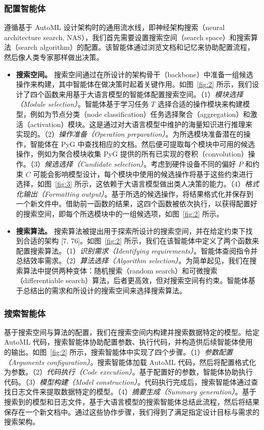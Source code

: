 \documentclass[11pt,UTF8,fontset=fandol]{ctexart}
\begin{document}
\subsubsection{配置智能体}
遵循基于 AutoML 设计架构时的通用流水线，即神经架构搜索（neural architecture search, NAS），我们首先需要设置搜索空间（search space）和搜索算法（search algorithm）的配置。该智能体通过浏览文档和记忆来协助配置流程，然后像人类专家那样做出决策。
\begin{itemize}[leftmargin=1.4em]
\item \textbf{搜索空间。} 搜索空间通过在所设计的架构骨干（backbone）中准备一组候选操作来构建，其中智能体在做决策时起着关键作用。如图~\ref{fig:2} 所示，我们设计了四个函数来用基于大语言模型的智能体配置搜索空间。（1）\textit{模块选择（Module selection）}。智能体基于学习任务 $T$ 选择合适的操作模块来构建模型，例如为节点分类（node classification）任务选择聚合（aggregation）和激活（activation）模块。这是通过对大语言模型中维护的海量知识进行推理来实现的。（2）\textit{操作准备（Operation preparation）}。为所选模块准备潜在的操作，智能体在 PyG 中查找相应的文档。然后便可提取每个模块中可用的候选操作，例如为聚合模块收集 PyG 提供的所有已实现的卷积（convolution）操作。（3）\textit{候选选择（Candidate selection）}。考虑到硬件设备不同的偏好 $P$ 和约束 $C$ 可能会影响模型设计，每个模块中使用的候选操作将基于这些约束进行选择，如图~\ref{fig:3} 所示，这依赖于大语言模型做出类人决策的能力。（4）\textit{格式化输出（Formatting output）}。基于所选的候选操作，将结果格式化并保存到一个新文件中。借助前一函数的结果，这四个函数被依次执行，以获得配置好的搜索空间，即每个所选模块中的一组候选项，如图~\ref{fig:2} 所示。
\item \textbf{搜索算法。} 搜索算法被提出用于探索所设计的搜索空间，并在给定约束下找到合适的架构 [7, 76]。如图~\ref{fig:2} 所示，我们在该智能体中定义了两个函数来配置搜索算法。（1）\textit{识别需求（Identifying requirements）}。智能体查阅指令并总结效率需求。（2）\textit{算法选择（Algorithm selection）}。为简单起见，我们在搜索算法中提供两种变体：随机搜索（random search）和可微搜索（differentiable search）算法，后者更高效，但对搜索空间有约束。智能体基于总结出的需求和所设计的搜索空间来选择搜索算法。
\end{itemize}

\subsubsection{搜索智能体}
基于搜索空间与算法的配置，我们在搜索空间内构建并搜索数据特定的模型。给定 AutoML 代码，搜索智能体协助配置参数、执行代码，并构造供后续智能体使用的输出。如图~\ref{fig:2} 所示，搜索智能体中实现了四个步骤。（1）\textit{参数配置（Arguments configuration）}。搜索智能体加载 AutoML 代码，然后将配置格式化为参数。（2）\textit{代码执行（Code execution）}。基于配置好的参数，智能体协助执行代码。（3）\textit{模型构建（Model construction）}。代码执行完成后，搜索智能体通过查找日志文件来提取数据特定的模型。（4）\textit{摘要生成（Summary generation）}。基于搜索到的模型和日志文件，基于大语言模型的搜索智能体总结此流程，然后将结果保存在一个新文档中。通过这些协作步骤，我们得到了满足指定设计目标与需求的搜索架构。
\end{document}
